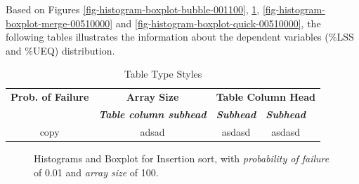 Based on Figures \ref{fig-histogram-boxplot-bubble-001100}, \ref{fig-histogram-boxplot-insertion-001100}, \ref{fig-histogram-boxplot-merge-00510000} and \ref{fig-histogram-boxplot-quick-00510000}, the following tables illustrates the information about the dependent variables (\%LSS and \%UEQ) distribution.

\begin{table}[H]
    \caption{Table Type Styles}
    \begin{center}
    \begin{tabular}{|c|c|c|c|c|}
    \hline
    \textbf{Prob. of Failure} & \textbf{Array Size} & \multicolumn{3}{|c|}{\textbf{Table Column Head}} \\
    \cline{2-4} 
     & \textbf{\textit{Table column subhead}}& \textbf{\textit{Subhead}}& \textbf{\textit{Subhead}} \\
    \hline
    copy & adsad & asdasd & asdasd \\
    \hline
    \end{tabular}
    \label{tab-distribution-depentent-variable-ueq}
    \end{center}
\end{table}

\begin{figure}[H]
    \centering
    \caption{Histograms and Boxplot for Insertion sort, with \textit{probability of failure} of 0.01 and \textit{array size} of 100.}
    \label{fig-histogram-boxplot-insertion-001100}
\end{figure}

